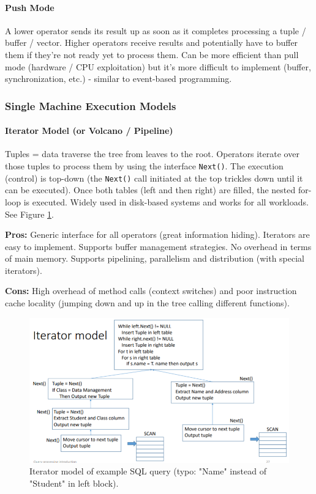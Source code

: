 \paragraph{Push Mode}
A lower operator sends its result up as soon as it completes processing a tuple / buffer / vector. Higher operators receive results and potentially have to buffer them if they're not ready yet to process them. Can be more efficient than pull mode (hardware / CPU exploitation) but it's more difficult to implement (buffer, synchronization, etc.) - similar to event-based programming. %


\subsubsection{Single Machine Execution Models}


\paragraph{Iterator Model (or Volcano / Pipeline)}
Tuples = data traverse the tree from leaves to the root. Operators iterate over those tuples to process them by using the interface \texttt{Next()}. The execution (control) is top-down (the \texttt{Next()} call initiated at the top trickles down until it can be executed). Once both tables (left and then right) are filled, the nested for-loop is executed. Widely used in disk-based systems and works for all workloads. See Figure \ref{fig:iterator}.

\textbf{Pros:} Generic interface for all operators (great information hiding). Iterators are easy to implement. Supports buffer management strategies. No overhead in terms of main memory. Supports pipelining, parallelism and distribution (with special iterators).

\textbf{Cons:} High overhead of method calls (context switches) and poor instruction cache locality (jumping down and up in the tree calling different functions).

\begin{figure}[h]
	\centering
	\includegraphics[scale=0.7]{images/3-iterator.PNG}
	\caption{Iterator model of example SQL query (typo: "Name" instead of "Student" in left block).}
	\label{fig:iterator}
\end{figure}

